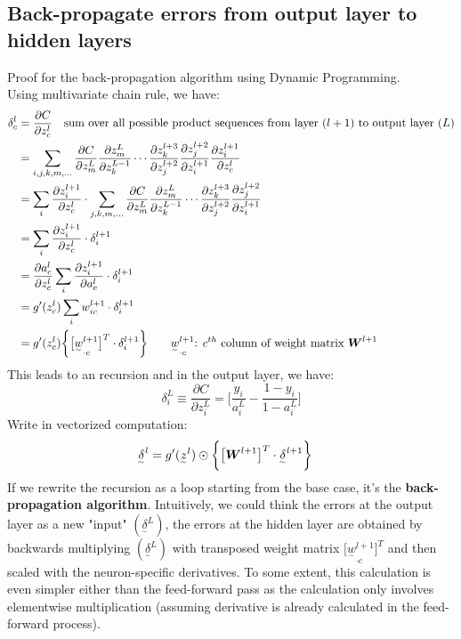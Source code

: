 \documentclass{extarticle}
\theoremstyle{definition}
\theoremstyle{definition}
\newcommand{\mdvec}[1]{\underset{^\sim}#1} %
\newcommand{\mdmat}[1]{\boldsymbol{\MakeUppercase{#1}}} %
\begin{document}
\subsection{Back-propagate errors from output layer to hidden layers}
Proof for the back-propagation algorithm using Dynamic Programming.\\
Using multivariate chain rule, we have:
\begin{align*}
	\delta_c^l &= \frac{\partial C}{\partial z_c^l} \quad  \text{sum over all possible product sequences from layer $(l+1)$ to output layer $(L)$}\\
			   &= \sum_{i, j, k, m, ...} \frac{\partial C}{\partial z_m^L} \frac{\partial z_m^{L}}{\partial z_k^{L-1}} \cdots \frac{\partial z_k^{l+3}}{\partial z_j^{l+2}} \frac{\partial z_j^{l+2}}{\partial z_i^{l+1}} \frac{\partial z_i^{l+1}}{\partial z_c^l}\\
			   &= \sum_i \frac{\partial z_i^{l+1}}{\partial z_c^l} \cdot \sum_{j, k, m, ...} \frac{\partial C}{\partial z_m^L} \frac{\partial z_m^{L}}{\partial z_k^{L-1}} \cdots \frac{\partial z_k^{l+3}}{\partial z_j^{l+2}} \frac{\partial z_j^{l+2}}{\partial z_i^{l+1}}\\
			   &= \sum_i \frac{\partial z_i^{l+1}}{\partial z_c^l} \cdot \delta_i^{l+1}\\
			   &= \frac{\partial a_c^l}{\partial z_c^l} \sum_i \frac{\partial z_i^{l+1}}{\partial a_c^l} \cdot \delta_i^{l+1}\\
			   &= g'(z_c^l) \sum_i w_{ic}^{l+1} \cdot \delta_i^{l+1}\\
			   &= g'(z_c^l) \bigg\{ \big[\mdvec{w_{\cdot c}^{l+1}}\big]^T \cdot \delta_i^{l+1}  \bigg\} \quad \quad \mdvec{w_{\cdot c}^{l+1}} \text{: $c^{th}$ column of weight matrix $\mdmat{W}^{l+1}$}
\end{align*}
This leads to an recursion and in the output layer, we have:
$$ \delta_i^L \equiv \frac{\partial C}{\partial z_i^L} = \bigg[\frac{y_i}{a_i^L} - \frac{1 - y_i}{1 - a_i^L}\bigg] $$
Write in vectorized computation:
\begin{align*}
	\mdvec{\delta^l} &= g'(\mdvec{z^l}) \odot \bigg\{ \big[\mdmat{w}^{l+1}\big]^T \cdot \mdvec{\delta^{l+1}} \bigg\}
\end{align*}
If we rewrite the recursion as a loop starting from the base case, it's the \textbf{back-propagation algorithm}. Intuitively, we could think the errors at the output layer as a new "input" $(\mdvec{\delta^L})$, the errors at the hidden layer are obtained by backwards multiplying $(\mdvec{\delta^L})$ with transposed weight matrix $\big[\mdvec{w_{\cdot c}^{l+1}}\big]^T$ and then scaled with the neuron-specific derivatives. To some extent, this calculation is even simpler either than the feed-forward pass as the calculation only involves elementwise multiplication (assuming derivative is already calculated in the feed-forward process).
\end{document}
